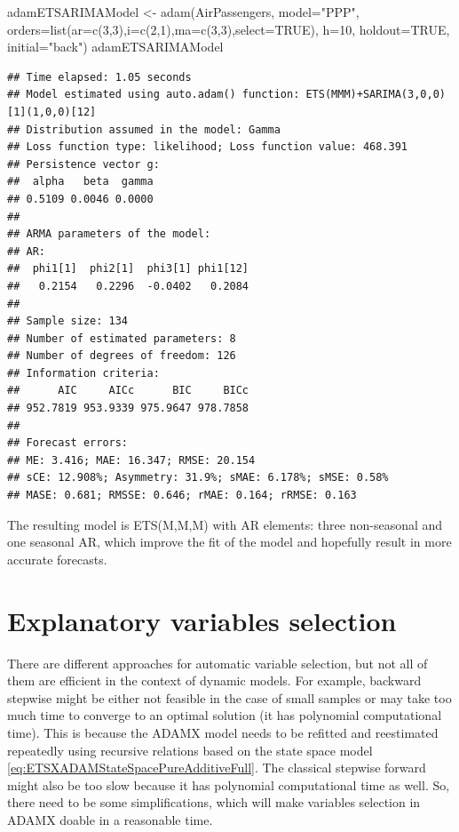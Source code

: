 \documentclass[
]{book}
\newenvironment{Shaded}{\begin{snugshade}}{\end{snugshade}}
\newcommand{\AttributeTok}[1]{\textcolor[rgb]{0.77,0.63,0.00}{#1}}
\newcommand{\ConstantTok}[1]{\textcolor[rgb]{0.00,0.00,0.00}{#1}}
\newcommand{\DecValTok}[1]{\textcolor[rgb]{0.00,0.00,0.81}{#1}}
\newcommand{\FunctionTok}[1]{\textcolor[rgb]{0.00,0.00,0.00}{#1}}
\newcommand{\NormalTok}[1]{#1}
\newcommand{\OtherTok}[1]{\textcolor[rgb]{0.56,0.35,0.01}{#1}}
\newcommand{\StringTok}[1]{\textcolor[rgb]{0.31,0.60,0.02}{#1}}
\theoremstyle{definition}
\theoremstyle{definition}
\theoremstyle{definition}
\theoremstyle{definition}
\theoremstyle{remark}
\begin{document}
\begin{Shaded}
\begin{Highlighting}[]
\NormalTok{adamETSARIMAModel }\OtherTok{\textless{}{-}}
    \FunctionTok{adam}\NormalTok{(AirPassengers, }\AttributeTok{model=}\StringTok{"PPP"}\NormalTok{,}
         \AttributeTok{orders=}\FunctionTok{list}\NormalTok{(}\AttributeTok{ar=}\FunctionTok{c}\NormalTok{(}\DecValTok{3}\NormalTok{,}\DecValTok{3}\NormalTok{),}\AttributeTok{i=}\FunctionTok{c}\NormalTok{(}\DecValTok{2}\NormalTok{,}\DecValTok{1}\NormalTok{),}\AttributeTok{ma=}\FunctionTok{c}\NormalTok{(}\DecValTok{3}\NormalTok{,}\DecValTok{3}\NormalTok{),}\AttributeTok{select=}\ConstantTok{TRUE}\NormalTok{),}
         \AttributeTok{h=}\DecValTok{10}\NormalTok{, }\AttributeTok{holdout=}\ConstantTok{TRUE}\NormalTok{, }\AttributeTok{initial=}\StringTok{"back"}\NormalTok{)}
\NormalTok{adamETSARIMAModel}
\end{Highlighting}
\end{Shaded}

\begin{verbatim}
## Time elapsed: 1.05 seconds
## Model estimated using auto.adam() function: ETS(MMM)+SARIMA(3,0,0)[1](1,0,0)[12]
## Distribution assumed in the model: Gamma
## Loss function type: likelihood; Loss function value: 468.391
## Persistence vector g:
##  alpha   beta  gamma 
## 0.5109 0.0046 0.0000 
## 
## ARMA parameters of the model:
## AR:
##  phi1[1]  phi2[1]  phi3[1] phi1[12] 
##   0.2154   0.2296  -0.0402   0.2084 
## 
## Sample size: 134
## Number of estimated parameters: 8
## Number of degrees of freedom: 126
## Information criteria:
##      AIC     AICc      BIC     BICc 
## 952.7819 953.9339 975.9647 978.7858 
## 
## Forecast errors:
## ME: 3.416; MAE: 16.347; RMSE: 20.154
## sCE: 12.908%; Asymmetry: 31.9%; sMAE: 6.178%; sMSE: 0.58%
## MASE: 0.681; RMSSE: 0.646; rMAE: 0.164; rRMSE: 0.163
\end{verbatim}

The resulting model is ETS(M,M,M) with AR elements: three non-seasonal and one seasonal AR, which improve the fit of the model and hopefully result in more accurate forecasts.

\hypertarget{ETSXSelection}{%
\section{Explanatory variables selection}\label{ETSXSelection}}

There are different approaches for automatic variable selection, but not all of them are efficient in the context of dynamic models. For example, backward stepwise might be either not feasible in the case of small samples or may take too much time to converge to an optimal solution (it has polynomial computational time). This is because the ADAMX model needs to be refitted and reestimated repeatedly using recursive relations based on the state space model \eqref{eq:ETSXADAMStateSpacePureAdditiveFull}. The classical stepwise forward might also be too slow because it has polynomial computational time as well. So, there need to be some simplifications, which will make variables selection in ADAMX doable in a reasonable time.
\end{document}

